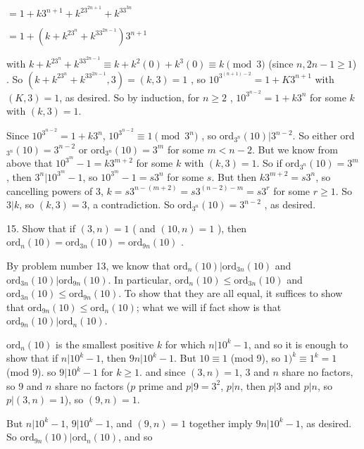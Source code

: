 \hskip1in $= 1+k3^{n+1}+k^23^{2n+1}+k^33^{3n}$

\hskip1in $= 1+(k+k^23^{n}+k^33^{2n-1})3^{n+1}$ 

\ssk

\ni with $k+k^23^{n}+k^33^{2n-1}\equiv k+k^2(0)+k^3(0)\equiv k\pmod 3$ (since $n,2n-1\geq 1$) . 
So $(k+k^23^{n}+k^33^{2n-1},3)=(k,3)=1$ , so $\displaystyle 10^{3^{(n+1)-2}}=1+K3^{n+1}$ with $(K,3)=1$,
as desired. So by induction, for $n\geq 2$ , $\displaystyle 10^{3^{n-2}}=1+k3^n$ for some $k$ with $(k,3)=1$.

\msk

\ni Since $\displaystyle 10^{3^{n-2}}=1+k3^n$, $\displaystyle 10^{3^{n-2}}\equiv 1 \pmod{3^n}$ , 
so ord$_{3^n}(10)|3^{n-2}$. So either
ord$_{3^n}(10) = 3^{n-2}$ or ord$_{3^n}(10) = 3^{m}$ for some $m<n-2$. But we know from above that
$\displaystyle 10^{3^{m}}-1=k3^{m+2}$ for some $k$ with $(k,3)=1$.
So if ord$_{3^n}(10) = 3^{m}$, then $\displaystyle 3^n|10^{3^{m}}-1$,
so $10^{3^{m}}-1=s3^n$ for some $s$. But then $k3^{m+2}=s3^n$, so cancelling powers of 3, $k=s3^{n-(m+2)} = s3^{(n-2)-m} = s3^r$ for
some $r\geq 1$. So $3|k$, so $(k,3)=3$, a contradiction. So ord$_{3^n}(10) = 3^{n-2}$ , as desired.

\bsk

\item{15.} Show that if $(3,n)=1$ ( and $(10,n)=1$ ), 
then $\text{ord}_{n}(10)=\text{ord}_{3n}(10)=\text{ord}_{9n}(10)$ .

\bsk

\ni By problem number 13, we know that $\text{ord}_{n}(10)|\text{ord}_{3n}(10)$ and $\text{ord}_{3n}(10)|\text{ord}_{9n}(10)$.
In particular, $\text{ord}_{n}(10)\leq\text{ord}_{3n}(10)$ and $\text{ord}_{3n}(10)\leq\text{ord}_{9n}(10)$.
To show that they are all equal, it suffices to show that $\text{ord}_{9n}(10)\leq\text{ord}_{n}(10)$;
what we will if fact show is that $\text{ord}_{9n}(10)|\text{ord}_{n}(10)$.

\ssk

\ni $\text{ord}_{n}(10)$ is the smallest positive $k$ for which $n|10^k-1$, and so it is enough to show that
if $n|10^k-1$, then $9n|10^k-1$. But $10\equiv 1$ (mod 9), so $1)^k\equiv 1^k=1$ (mod 9).
so $9|10^k-1$ for  $k\geq 1$. and since $(3,n)=1$, 3 and $n$ share no factors, so 9 and $n$
share no factors ($p$ prime and $p|9=3^2$, $p|n$, then $p|3$ and $p|n$, so $p|(3,n)=1$), so $(9,n)=1$.

\ssk

But $n|10^k-1$, $9|10^k-1$, and $(9,n)=1$ together imply $9n|10^k-1$, as desired. So $\text{ord}_{9n}(10)|\text{ord}_{n}(10)$,
and so


